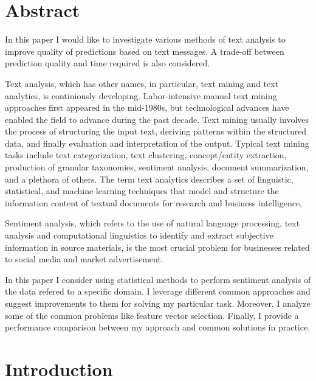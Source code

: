 \documentclass[12pt]{report}
\begin{document}
\renewcommand{\bibname}{References}
\setcounter{tocdepth}{1}

\setcounter{page}{2}

\large

\thispagestyle{empty}
\tableofcontents

\chapter*{Abstract}

In this paper I would like to investigate various methods of text analysis to improve quality of predictions based on text messages. A trade-off between prediction quality and time required is also considered.

Text analysis, which has other names, in particular, text mining and text analytics, is continiously developing. Labor-intensive manual text mining approaches first appeared in the mid-1980s, but technological advances have enabled the field to advance during the past decade. Text mining usually involves the process of structuring the input text, deriving patterns within the structured data, and finally evaluation and interpretation of the output. Typical text mining tasks include text categorization, text clustering, concept/entity extraction, production of granular taxonomies, sentiment analysis, document summarization, and a plethora of others.
The term text analytics describes a set of linguistic, statistical, and machine learning techniques that model and structure the information content of textual documents for research and business intelligence,

Sentiment analysis, which refers to the use of natural language processing, text analysis and computational linguistics to identify and extract subjective information in source materials, is the most crucial problem for businesses related to social media and market advertisement.

In this paper I consider using statistical methods to perform sentiment analysis of the data refered to a specific domain. I leverage different common approaches and suggest improvements to them for solving my particular task. Moreover, I analyze some of the common problems like feature vector selection. Finally, I provide a performance comparison between my approach and common solutions in practice.

\newpage

\chapter*{Introduction}
\end{document}
